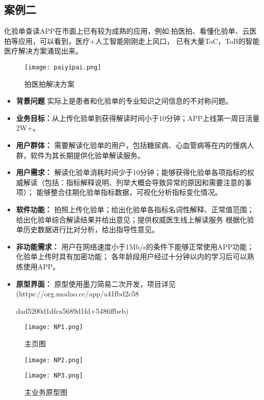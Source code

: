 \documentclass[withoutpreface,bwprint]{cumcmthesis} %
\begin{document}
\subsection{案例二}
化验单查读APP在市面上已有较为成熟的应用，例如:拍医拍、看懂化验单、云医拍等应用，可以看到，医疗+人工智能刚刚走上风口，
已有大量ToC，ToB的智能医疗解决方案涌现出来。
\begin{figure}[H]
	\centering
    \texttt{[image: paiyipai.png]}
	\caption{ 拍医拍解决方案 \label{fig:1}}
\end{figure}

\begin{itemize}
\item \textbf{背景问题} 实际上是患者和化验单的专业知识之间信息的不对称问题。
\item \textbf{业务目标：}从上传化验单到获得解读时间小于10分钟；APP上线第一周日活量2W+。
\item \textbf{用户群体：} 需要解读化验单的用户，包括糖尿病、心血管病等在内的慢病人群，软件为其长期提供化验单解读服务。
\item  \textbf{用户需求：} 解读化验单消耗时间少于10分钟；能够获得化验单各项指标的权威解读（包括：指标解释说明、列举大概会导致异常的原因和需要注意的事项）；
                          能够整合往期化验单指标数据，可视化分析指标变化情况。
\item  \textbf{软件功能：} 拍照上传化验单；给出化验单各指标名词性解释、正常值范围；给出化验单综合解读结果并给出意见；提供权威医生线上解读服务
                          根据化验单历史数据进行比对分析，给出指导性意见。
\item  \textbf{非功能需求：} 用户在网络速度小于1Mb/s的条件下能够正常使用APP功能；化验单上传时具有加密功能；
                            各年龄段用户经过十分钟以内的学习后可以熟练使用APP。
\item  \textbf{原型界面：}   原型使用墨刀简易二次开发，项目详见(https://org.modao.cc/app/a41fbd2c58

dad5200d1dfca5689d1fd+5486ffbeb)
 
   \end{itemize}
   
\begin{figure}[H]
    \centering
    \texttt{[image: NP1.png]}
    \caption{主页图}
    \label{fig:circuit-diagram}
\end{figure}

\begin{figure}[H]
    \centering
    \begin{minipage}[c]{0.4\textwidth}
        \centering
        \texttt{[image: NP2.png]}
    \end{minipage}
    \begin{minipage}[c]{0.4\textwidth}
        \centering
        \texttt{[image: NP3.png]}
    \end{minipage}
    \caption{主业务原型图}
\end{figure}
\end{document}
